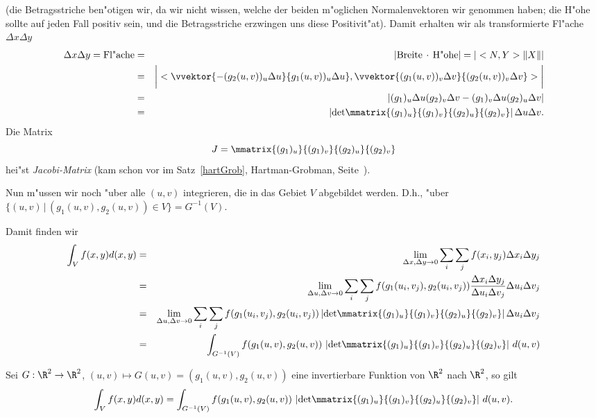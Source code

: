 (die Betragsstriche ben"otigen wir, da wir nicht wissen, 
welche der beiden m"oglichen 
Normalenvektoren wir genommen haben; die H"ohe 
sollte auf jeden Fall positiv sein, 
und die Betragsstriche erzwingen uns  diese Positivit"at).
Damit erhalten wir als transformierte Fl"ache $\Delta x\Delta y$
\begin{eqnarray*} 
\Delta x\Delta y = \mbox{Fl"ache}  & = & |\mbox{Breite} \,\cdot\,\mbox{H"ohe} | = |<N,Y>\|X\| | \\
& = & \bigg| <  \vvektor{-(g_2(u,v))_u\Delta u}{g_1(u,v))_u\Delta u}, 
\vvektor{(g_1(u,v))_v\Delta v}{(g_2(u,v))_v\Delta v}>\bigg| \\
& =& 
 |(g_1)_u \Delta u(g_2)_v \Delta v -(g_1)_v \Delta u(g_2)_u \Delta v| \\
 & =& \left|\mbox{det}\mmatrix{(g_1)_u}{(g_1)_v}{(g_2)_u}{(g_2)_v}\right | \Delta u \Delta v.
 \end{eqnarray*}
Die Matrix
$$ J = \mmatrix{(g_1)_u}{(g_1)_v}{(g_2)_u}{(g_2)_v}
$$
hei"st \emph{Jacobi-Matrix} (kam schon vor im Satz~\ref{hartGrob}, 
Hartman-Grobman, Seite~\pageref{hartGrob}). 
\par\bigskip
Nun m"ussen wir noch "uber alle $(u,v)$ integrieren, die in das Gebiet 
$V$ abgebildet werden. D.h., "uber $\{(u,v)\,|\,(g_1(u,v),g_2(u,v))\in V\} = G^{-1} (V)$. \par\bigskip
Damit finden wir
\begin{eqnarray*} 
\int_V f(x,y) d(x,y) 
& = & \lim_{\Delta x, \Delta y\rightarrow 0} \sum_i\sum_j  f(x_i,y_j) \Delta x_i\Delta y_j\\
& = & \lim_{\Delta u, \Delta v\rightarrow 0} \sum_i\sum_j  f(g_1(u_i,v_j),g_2(u_i,v_j)) 
                     \frac{\Delta x_i\Delta y_j}{\Delta u_i \Delta v_j} \Delta u_i \Delta v_j\\
& = & \lim_{\Delta u, \Delta v\rightarrow 0} \sum_i\sum_j  f(g_1(u_i,v_j),g_2(u_i,v_j))  
                      \left|\mbox{det}\mmatrix{(g_1)_u}{(g_1)_v}{(g_2)_u}{(g_2)_v}\right | \Delta u_i \Delta v_j\\
& = & \int_{G^{-1}(V)} f(g_1(u,v), g_2(u,v))\, \left  |\mbox{det}\mmatrix{(g_1)_u}{(g_1)_v}{(g_2)_u}{(g_2)_v}\right | \, d(u,v)
\end{eqnarray*}

\begin{ssatz}
Sei $G:\R^2\rightarrow\R^2$, $(u,v)\mapsto G(u,v)=(g_1(u,v), g_2(u,v))$ eine invertierbare Funktion von $\R^2$ nach $\R^2$, so gilt
$$
\int_V f(x,y) d(x,y) 
 = 
 \int_{G^{-1}(V)} f(g_1(u,v), g_2(u,v))\, \left  |\mbox{det}\mmatrix{(g_1)_u}{(g_1)_v}{(g_2)_u}{(g_2)_v}\right | \, d(u,v).$$
\end{ssatz}

